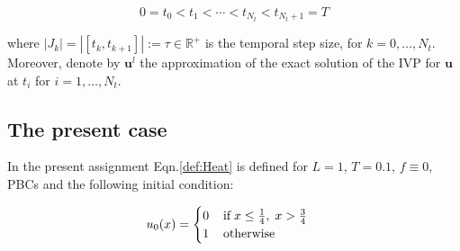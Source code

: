 \documentclass[11pt]{article}
\theoremstyle{theorem}
\theoremstyle{definition}
\begin{document}
$$0 = t_0 < t_1 < \cdots < t_{N_t} < t_{N_t + 1} = T$$

where $|J_k| = | [t_{k},t_{k+1}] | := \tau\in\mathbb{R}^+$ is the temporal step size, for $ k = 0,\ldots,N_t $. Moreover, denote by $ \mathbf{u}^{l} $ the approximation of the exact solution of the IVP for $ \mathbf{u} $ at $ t_i $ for $ i = 1,\ldots,N_t $.

\subsection{The present case}
In the present assignment Eqn.\eqref{def:Heat} is defined for $L=1$, $T=0.1$, $f\equiv 0$, PBCs and the following initial condition:

\begin{align}
\label{eqn:init-cond}
u_0(x)=
\begin{cases}
0\hspace{4mm}\text{if}\hspace{1mm} x\le\frac{1}{4},\hspace{1mm}x>\frac{3}{4}\\
1\hspace{4mm}\text{otherwise}
\end{cases}
\end{align}
\end{document}
